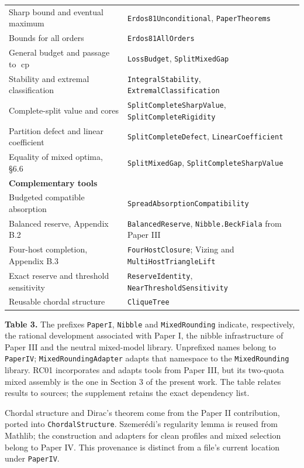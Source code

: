 \documentclass[english,11pt,a4paper]{article}
\begin{document}
{\begin{longtable}[c]{@{}
  >{\raggedright\arraybackslash}p{}
  >{\raggedright\arraybackslash}p{}@{}}
Sharp bound and eventual maximum & \nolinkurl{Erdos81Unconditional}, \nolinkurl{PaperTheorems} \\
Bounds for all orders & \nolinkurl{Erdos81AllOrders} \\
General budget and passage to \(\operatorname{cp}\) & \nolinkurl{LossBudget}, \nolinkurl{SplitMixedGap} \\
Stability and extremal classification & \nolinkurl{IntegralStability}, \nolinkurl{ExtremalClassification} \\
Complete-split value and cores & \nolinkurl{SplitCompleteSharpValue}, \nolinkurl{SplitCompleteRigidity} \\
Partition defect and linear coefficient & \nolinkurl{SplitCompleteDefect}, \nolinkurl{LinearCoefficient} \\
Equality of mixed optima, §6.6 & \nolinkurl{SplitMixedGap}, \nolinkurl{SplitCompleteSharpValue} \\
\textbf{Complementary tools} & \\
Budgeted compatible absorption & \nolinkurl{SpreadAbsorptionCompatibility} \\
Balanced reserve, Appendix B.2 & \nolinkurl{BalancedReserve}, \nolinkurl{Nibble.BeckFiala} from Paper III \\
Four-host completion, Appendix B.3 & \nolinkurl{FourHostClosure}; Vizing and \nolinkurl{MultiHostTriangleLift} \\
Exact reserve and threshold sensitivity & \nolinkurl{ReserveIdentity}, \nolinkurl{NearThresholdSensitivity} \\
Reusable chordal structure & \nolinkurl{CliqueTree} \\
\end{longtable}
}

\textbf{Table 3.} The prefixes \nolinkurl{PaperI}, \nolinkurl{Nibble} and \nolinkurl{MixedRounding} indicate, respectively, the rational development associated with Paper I, the nibble infrastructure of Paper III and the neutral mixed-model library. Unprefixed names belong to \nolinkurl{PaperIV}; \nolinkurl{MixedRoundingAdapter} adapts that namespace to the \nolinkurl{MixedRounding} library. RC01 incorporates and adapts tools from Paper III, but its two-quota mixed assembly is the one in Section 3 of the present work. The table relates results to sources; the supplement retains the exact dependency list.

Chordal structure and Dirac's theorem come from the Paper II contribution, ported into \nolinkurl{ChordalStructure}. Szemerédi's regularity lemma is reused from Mathlib; the construction and adapters for clean profiles and mixed selection belong to Paper IV. This provenance is distinct from a file's current location under \nolinkurl{PaperIV}.
\end{document}
